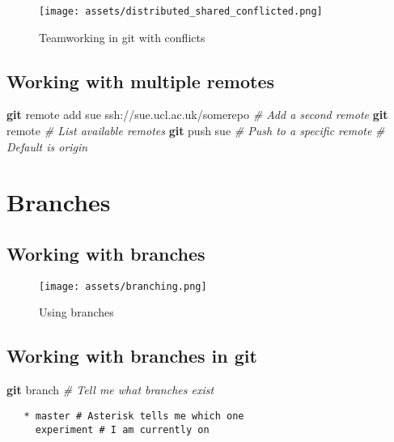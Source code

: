 \documentclass[]{scrartcl}
\makeatletter
\newenvironment{Shaded}{}{}
\newcommand{\KeywordTok}[1]{\textcolor[rgb]{0.00,0.44,0.13}{\textbf{{#1}}}}
\newcommand{\CommentTok}[1]{\textcolor[rgb]{0.38,0.63,0.69}{\textit{{#1}}}}
\newcommand{\NormalTok}[1]{{#1}}
\def\maxwidth{\ifdim\Gin@nat@width>\linewidth\linewidth
\else\Gin@nat@width\fi}
\let\Oldincludegraphics\includegraphics
\renewcommand{\includegraphics}[1]{\Oldincludegraphics[width=\maxwidth]{#1}}
\makeatother
\begin{document}
\begin{figure}[htbp]
\centering
\texttt{[image: assets/distributed\_shared\_conflicted.png]}
\caption{Teamworking in git with conflicts}
\end{figure}

\subsection{Working with multiple
remotes}\label{working-with-multiple-remotes}

\begin{Shaded}
\begin{Highlighting}[]
\KeywordTok{git} \NormalTok{remote add sue ssh://sue.ucl.ac.uk/somerepo}
   \CommentTok{# Add a second remote}
\KeywordTok{git} \NormalTok{remote}
   \CommentTok{# List available remotes}
\KeywordTok{git} \NormalTok{push sue}
   \CommentTok{# Push to a specific remote}
   \CommentTok{# Default is origin}
\end{Highlighting}
\end{Shaded}

\section{Branches}\label{branches}

\subsection{Working with branches}\label{working-with-branches}

\begin{figure}[htbp]
\centering
\texttt{[image: assets/branching.png]}
\caption{Using branches}
\end{figure}

\subsection{Working with branches in
git}\label{working-with-branches-in-git}

\begin{Shaded}
\begin{Highlighting}[]
\KeywordTok{git} \NormalTok{branch }\CommentTok{# Tell me what branches exist}
\end{Highlighting}
\end{Shaded}

\begin{verbatim}
   * master # Asterisk tells me which one
     experiment # I am currently on
\end{verbatim}
\end{document}
